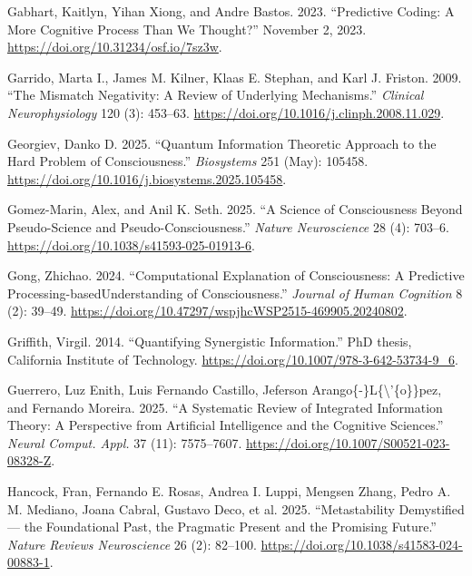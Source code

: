\documentclass[
  a4paper]{article}
\newlength{\cslhangindent}
\newenvironment{CSLReferences}[2] %
 {\begin{list}{}{%
  \setlength{\itemindent}{0pt}
  \setlength{\leftmargin}{0pt}
  \setlength{\parsep}{0pt}
  \ifodd #1
   \setlength{\leftmargin}{\cslhangindent}
   \setlength{\itemindent}{-1\cslhangindent}
  \fi
  \setlength{\itemsep}{#2\baselineskip}}}
 {\end{list}}
\begin{document}
\begin{CSLReferences}{1}{0}
Gabhart, Kaitlyn, Yihan Xiong, and Andre Bastos. 2023. {``Predictive
Coding: A More Cognitive Process Than We Thought?''} November 2, 2023.
\url{https://doi.org/10.31234/osf.io/7sz3w}.

Garrido, Marta I., James M. Kilner, Klaas E. Stephan, and Karl J.
Friston. 2009. {``The Mismatch Negativity: A Review of Underlying
Mechanisms.''} \emph{Clinical Neurophysiology} 120 (3): 453--63.
\url{https://doi.org/10.1016/j.clinph.2008.11.029}.

Georgiev, Danko D. 2025. {``Quantum Information Theoretic Approach to
the Hard Problem of Consciousness.''} \emph{Biosystems} 251 (May):
105458. \url{https://doi.org/10.1016/j.biosystems.2025.105458}.

Gomez-Marin, Alex, and Anil K. Seth. 2025. {``A Science of Consciousness
Beyond Pseudo-Science and Pseudo-Consciousness.''} \emph{Nature
Neuroscience} 28 (4): 703--6.
\url{https://doi.org/10.1038/s41593-025-01913-6}.

Gong, Zhichao. 2024. {``Computational Explanation of Consciousness: A
Predictive Processing-{basedUnderstanding} of Consciousness.''}
\emph{Journal of Human Cognition} 8 (2): 39--49.
\url{https://doi.org/10.47297/wspjhcWSP2515-469905.20240802}.

Griffith, Virgil. 2014. {``Quantifying Synergistic Information.''} PhD
thesis, California Institute of Technology.
\url{https://doi.org/10.1007/978-3-642-53734-9_6}.

Guerrero, Luz Enith, Luis Fernando Castillo, Jeferson
Arango\{-\}L\{\textbackslash'\{o\}\}pez, and Fernando Moreira. 2025.
{``A Systematic Review of Integrated Information Theory: A Perspective
from Artificial Intelligence and the Cognitive Sciences.''} \emph{Neural
Comput. Appl.} 37 (11): 7575--7607.
\url{https://doi.org/10.1007/S00521-023-08328-Z}.

Hancock, Fran, Fernando E. Rosas, Andrea I. Luppi, Mengsen Zhang, Pedro
A. M. Mediano, Joana Cabral, Gustavo Deco, et al. 2025. {``Metastability
Demystified --- the Foundational Past, the Pragmatic Present and the
Promising Future.''} \emph{Nature Reviews Neuroscience} 26 (2): 82--100.
\url{https://doi.org/10.1038/s41583-024-00883-1}.


\end{CSLReferences}
\end{document}
